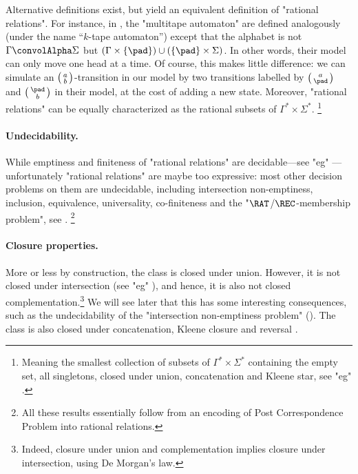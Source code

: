 Alternative definitions exist, but yield an equivalent definition of "rational relations".
For instance, in \cite[Definition~2.1]{CartonChoffrutGrigorieff2006DecisionProblems},
the "multitape automaton" are defined analogously (under the name ``$k$-tape automaton'')
except that the alphabet is not $\Gamma \convolAlpha \Sigma$ but 
$(\Gamma \times \{\pad\}) \cup (\{\pad\}\times \Sigma)$. In other words,
their model can only move one head at a time.
Of course, this makes little difference: we can simulate an $\pair{a}{b}$-transition in our model
by two transitions labelled by $\pair{a}{\pad}$ and $\pair{\pad}{b}$ in their model, at the cost of adding a new state.
Moreover, "rational relations" can be equally characterized as the rational subsets of $\Gamma^*\times\Sigma^*$.%
\footnote{Meaning the smallest collection of subsets of $\Gamma^*\times\Sigma^*$ containing the empty set, all singletons, closed under union, concatenation and Kleene star,
see "eg" \cite[\S~III.2, Definition]{Berstel1979Transductions}.}

\paragraph*{Undecidability.}
While emptiness and finiteness of "rational relations" are
decidable---see "eg" \cite[\S~III, Proposition~8.2]{Berstel1979Transductions}---%
unfortunately "rational relations" are maybe too expressive: most other decision problems on them 
are undecidable, including intersection non-emptiness, inclusion, equivalence, universality, co-finiteness and the "$\RAT$/$\REC$-membership problem", see \cite[\S~III, Theorem~8.4]{Berstel1979Transductions}.%
\footnote{All these results essentially follow
from an encoding of Post Correspondence Problem into rational relations.}

\paragraph*{Closure properties.}
More or less by construction, the class is closed under union.
However, it is not closed under intersection
(see "eg" \cite[\S~III, Example~2.5]{Berstel1979Transductions}),
and hence, it is also not closed complementation.\footnote{Indeed, closure under union
and complementation implies closure under intersection, using De Morgan's law.}
We will see later that this has some interesting consequences, such as the undecidability
of the "intersection non-emptiness problem" ().
The class is also closed under concatenation, Kleene closure and reversal \cite[\S~3, Table~I]{FischerRosenberg1968Multitape}.

